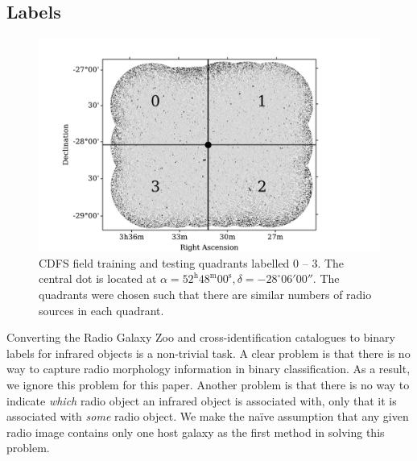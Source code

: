 \documentclass[fleqn,usenatbib,usedcolumn]{mnras}
\begin{document}
  \subsection{Labels}\label{labels}
    \begin{figure}
      \centering
      \includegraphics[width=\columnwidth]{images/quadrants.pdf}
      \caption{CDFS field training and testing quadrants labelled 0 -- 3. The
        central dot is located at $\alpha = 52^\text{h}48^\text{m}00^\text{s},
        \delta = -28^\circ{}06'00''$. The quadrants were chosen such that
        there are similar numbers of radio sources in each
        quadrant.\label{fig:quadrants}}
    \end{figure}
    
    Converting the Radio Galaxy Zoo and \citet{norris06} cross-identification
    catalogues to binary labels for infrared objects is a non-trivial task. A
    clear problem is that there is no way to capture radio morphology
    information in binary classification. As a result, we ignore this problem
    for this paper. Another problem is that there is no way to indicate
    \emph{which} radio object an infrared object is associated with, only that
    it is associated with \emph{some} radio object. We make the na\"ive
    assumption that any given radio image contains only one host galaxy as the
    first method in solving this problem.
\end{document}
